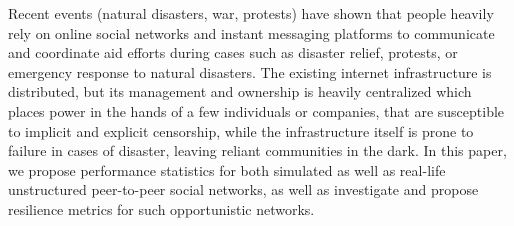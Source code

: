 Recent events (natural disasters, war, protests) have shown that people heavily rely on online social networks and instant messaging platforms to communicate and coordinate aid efforts during cases such as disaster relief, protests, or emergency response to natural disasters. The existing internet infrastructure is distributed, but its management and ownership is heavily centralized which places power in the hands of a few individuals or companies, that are susceptible to implicit and explicit censorship, while the infrastructure itself is prone to failure in cases of disaster, leaving reliant communities in the dark. In this paper, we propose performance statistics for both simulated as well as real-life unstructured peer-to-peer social networks, as well as investigate and propose resilience metrics for such opportunistic networks.